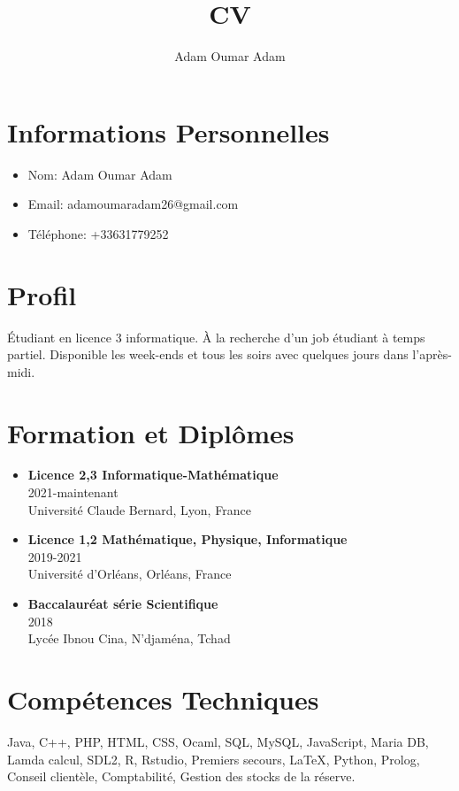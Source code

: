 \documentclass{article}
\title{CV}
\author{Adam Oumar Adam}
\date{}
\begin{document}
\maketitle

\section*{Informations Personnelles}
\begin{itemize}[label=--]
    \item Nom: Adam Oumar Adam
    \item Email: adamoumaradam26@gmail.com
    \item Téléphone: +33631779252
\end{itemize}

\section*{Profil}
Étudiant en licence 3 informatique. À la recherche d’un job étudiant à temps partiel. Disponible les week-ends et tous les soirs avec quelques jours dans l’après-midi.

\section*{Formation et Diplômes}
\begin{itemize}[label=--]
    \item \textbf{Licence 2,3 Informatique-Mathématique}\\
    2021-maintenant \\
    Université Claude Bernard, Lyon, France
    
    \item \textbf{Licence 1,2 Mathématique, Physique, Informatique}\\
    2019-2021 \\
    Université d’Orléans, Orléans, France
    
    \item \textbf{Baccalauréat série Scientifique}\\
    2018 \\
    Lycée Ibnou Cina, N’djaména, Tchad
\end{itemize}

\section*{Compétences Techniques}
Java, C++, PHP, HTML, CSS, Ocaml, SQL, MySQL, JavaScript, Maria DB, Lamda calcul, SDL2, R, Rstudio, Premiers secours, \LaTeX, Python, Prolog, Conseil clientèle, Comptabilité, Gestion des stocks de la réserve.
\end{document}

